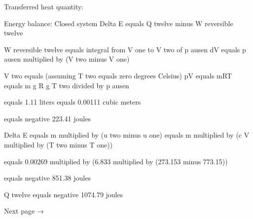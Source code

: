 Transferred heat quantity:  

Energy balance: Closed system  
Delta E equals Q twelve minus W reversible twelve  

W reversible twelve equals integral from V one to V two of p ausen dV equals p ausen multiplied by (V two minus V one)  

V two equals (assuming T two equals zero degrees Celsius)  
pV equals mRT  
equals m g R g T two divided by p ausen  

equals 1.11 liters equals 0.00111 cubic meters  

equals negative 223.41 joules  

Delta E equals m multiplied by (u two minus u one) equals m multiplied by (c V multiplied by (T two minus T one))  

equals 0.00269 multiplied by (6.833 multiplied by (273.153 minus 773.15))  

equals negative 851.38 joules  

Q twelve equals negative 1074.79 joules  

Next page →
